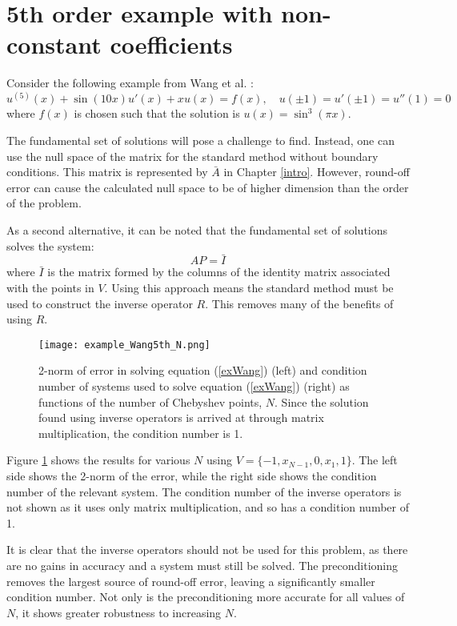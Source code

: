 \documentclass{sfuthesis}
\begin{document}
\section{5th order example with non-constant coefficients}

Consider the following example from Wang et al. \cite{wang2014well}:
\begin{equation} \label{exWang}
u^{(5)}(x) + \sin(10x) u'(x) + x u(x) = f(x), \quad u(\pm 1) = u'(\pm 1) = u''(1) = 0
\end{equation}
where $f(x)$ is chosen such that the solution is $u(x) = \sin^3(\pi x)$.

The fundamental set of solutions will pose a challenge to find.
Instead, one can use the null space of the matrix for the standard method without boundary conditions.
This matrix is represented by $\bar{A}$ in Chapter \ref{intro}.
However, round-off error can cause the calculated null space to be of higher dimension than the order of the problem.

As a second alternative, it can be noted that the fundamental set of solutions solves the system:
\begin{equation}
A P = \bar{I}
\end{equation}
where $\bar{I}$ is the matrix formed by the columns of the identity matrix associated with the points in $V$.
Using this approach means the standard method must be used to construct the inverse operator $R$.
This removes many of the benefits of using $R$.

\begin{figure}
\texttt{[image: example\_Wang5th\_N.png]}
\caption{2-norm of error in solving equation (\ref{exWang}) (left) and condition number of systems used to solve equation (\ref{exWang}) (right) as functions of the number of Chebyshev points, $N$. Since the solution found using inverse operators is arrived at through matrix multiplication, the condition number is 1.}
\label{fig:Wang5 N}
\end{figure}

Figure \ref{fig:Wang5 N} shows the results for various $N$ using $V = \{-1, x_{N-1}, 0, x_1, 1\}$.
The left side shows the 2-norm of the error, while the right side shows the condition number of the relevant system.
The condition number of the inverse operators is not shown as it uses only matrix multiplication, and so has a condition number of 1.

It is clear that the inverse operators should not be used for this problem, as there are no gains in accuracy and a system must still be solved.
The preconditioning removes the largest source of round-off error, leaving a significantly smaller condition number.
Not only is the preconditioning more accurate for all values of $N$, it shows greater robustness to increasing $N$.
\end{document}

